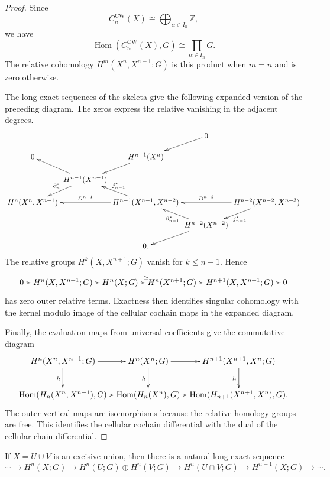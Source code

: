 \begin{proof}
Since
$$
C_n^{\mathrm{CW}}(X)
\cong
\bigoplus_{\alpha\in I_n}\mathbb{Z},
$$
we have
$$
\operatorname{Hom}
(C_n^{\mathrm{CW}}(X),G)
\cong
\prod_{\alpha\in I_n}G.
$$
The relative cohomology
$H^m(X^n,X^{n-1};G)$ is this product when
$m=n$ and is zero otherwise.

\noindent
The long exact sequences of the skeleta
give the following expanded version of the
preceding diagram.  The zeros express the
relative vanishing in the adjacent degrees.
{\small
$$
\xymatrix@C=.1em@R=1.3em{
  & & & 0 \ar[ld] \\
0
  & & H^{n-1}(X^n) \ar[ld] \\
  & H^{n-1}(X^{n-1})
    \ar[lu]
    \ar[ld]_{\partial_n^*} \\
H^n(X^n,X^{n-1})
  & & H^{n-1}(X^{n-1},X^{n-2})
      \ar[ll]_-{D^{n-1}}
      \ar[lu]_{j_{n-1}^*}
  & & H^{n-2}(X^{n-2},X^{n-3})
      \ar[ll]_-{D^{n-2}}
      \ar[ld]^{j_{n-2}^*} \\
  & & & H^{n-2}(X^{n-2})
          \ar[lu]^{\partial_{n-1}^*}
          \ar[ld] \\
  & & 0.
}
$$
}
The relative groups $H^k(X,X^{n+1};G)$
vanish for $k\leq n+1$.  Hence
$$
\xymatrix@C=.55em{
0 \ar[r]
  & H^n(X,X^{n+1};G) \ar[r]
  & H^n(X;G) \ar[r]^\cong
  & H^n(X^{n+1};G) \ar[r]
  & H^{n+1}(X,X^{n+1};G)
    \ar[r]
  & 0
}
$$
has zero outer relative terms.  Exactness
then identifies singular cohomology with
the kernel modulo image of the cellular
cochain maps in the expanded diagram.

\noindent
Finally, the evaluation maps from universal
coefficients give the commutative diagram
$$
\xymatrix@C=.55em{
H^n(X^n,X^{n-1};G)
  \ar[r] \ar[d]_h
  & H^n(X^n;G)
    \ar[r] \ar[d]_h
  & H^{n+1}(X^{n+1},X^n;G)
    \ar[d]_h \\
\operatorname{Hom}
(H_n(X^n,X^{n-1}),G)
  \ar[r]
  & \operatorname{Hom}(H_n(X^n),G)
    \ar[r]
  & \operatorname{Hom}
    (H_{n+1}(X^{n+1},X^n),G).
}
$$
The outer vertical maps are isomorphisms
because the relative homology groups are
free.  This identifies the cellular
cochain differential with the dual of the
cellular chain differential.
\end{proof}

\begin{theorem}
\label{at-theorem-mayer-vietoris-cohomology}
If $X=U\cup V$ is an excisive union, then
there is a natural long exact sequence
{\small
$$
\cdots\longrightarrow H^n(X;G)
\longrightarrow H^n(U;G)\oplus H^n(V;G)
\longrightarrow H^n(U\cap V;G)
\longrightarrow H^{n+1}(X;G)
\longrightarrow\cdots.
$$
}
\end{theorem}
